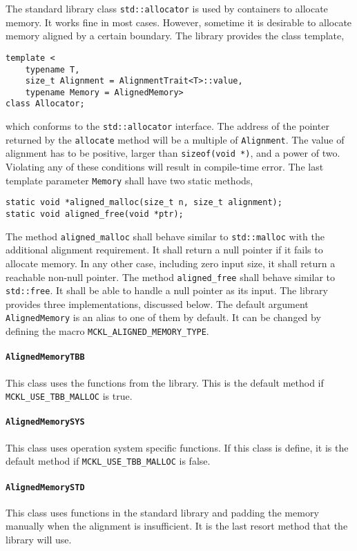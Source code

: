 The standard library class \verb|std::allocator| is used by containers to
allocate memory. It works fine in most cases. However, sometime it is desirable
to allocate memory aligned by a certain boundary. The library provides the
class template,
\begin{Verbatim}
template <
    typename T,
    size_t Alignment = AlignmentTrait<T>::value,
    typename Memory = AlignedMemory>
class Allocator;
\end{Verbatim}
which conforms to the \verb|std::allocator| interface. The address of the
pointer returned by the \verb|allocate| method will be a multiple of
\verb|Alignment|. The value of alignment has to be positive, larger than
\verb|sizeof(void *)|, and a power of two. Violating any of these conditions
will result in compile-time error. The last template parameter \verb|Memory|
shall have two static methods,
\begin{Verbatim}
static void *aligned_malloc(size_t n, size_t alignment);
static void aligned_free(void *ptr);
\end{Verbatim}
The method \verb|aligned_malloc| shall behave similar to \verb|std::malloc|
with the additional alignment requirement. It shall return a null pointer if it
fails to allocate memory. In any other case, including zero input size, it
shall return a reachable non-null pointer. The method \verb|aligned_free| shall
behave similar to \verb|std::free|. It shall be able to handle a null pointer
as its input. The library provides three implementations, discussed below. The
default argument \verb|AlignedMemory| is an alias to one of them by default. It
can be changed by defining the macro \verb|MCKL_ALIGNED_MEMORY_TYPE|.

\paragraph{\texttt{AlignedMemoryTBB}} This class uses the functions from the
\tbb library. This is the default method if \verb|MCKL_USE_TBB_MALLOC| is true.

\paragraph{\texttt{AlignedMemorySYS}} This class uses operation system specific
functions. If this class is define, it is the default method if
\verb|MCKL_USE_TBB_MALLOC| is false.

\paragraph{\texttt{AlignedMemorySTD}} This class uses functions in the standard
library and padding the memory manually when the alignment is insufficient. It
is the last resort method that the library will use.

